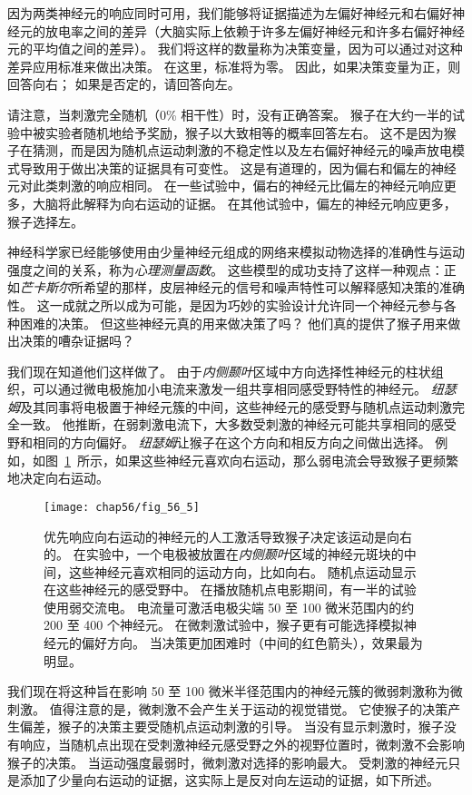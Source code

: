 因为两类神经元的响应同时可用，我们能够将证据描述为左偏好神经元和右偏好神经元的放电率之间的差异（大脑实际上依赖于许多左偏好神经元和许多右偏好神经元的平均值之间的差异）。
我们将这样的数量称为决策变量，因为可以通过对这种差异应用标准来做出决策。
在这里，标准将为零。
因此，如果决策变量为正，则回答向右；
如果是否定的，请回答向左。


请注意，当刺激完全随机（0\% 相干性）时，没有正确答案。
猴子在大约一半的试验中被实验者随机地给予奖励，猴子以大致相等的概率回答左右。
这不是因为猴子在猜测，而是因为随机点运动刺激的不稳定性以及左右偏好神经元的噪声放电模式导致用于做出决策的证据具有可变性。
这是有道理的，因为偏右和偏左的神经元对此类刺激的响应相同。
在一些试验中，偏右的神经元比偏左的神经元响应更多，大脑将此解释为向右运动的证据。
在其他试验中，偏左的神经元响应更多，猴子选择左。


神经科学家已经能够使用由少量神经元组成的网络来模拟动物选择的准确性与运动强度之间的关系，称为\textit{心理测量函数}。
这些模型的成功支持了这样一种观点：正如\textit{芒卡斯尔}所希望的那样，皮层神经元的信号和噪声特性可以解释感知决策的准确性。
这一成就之所以成为可能，是因为巧妙的实验设计允许同一个神经元参与各种困难的决策。
但这些神经元真的用来做决策了吗？
他们真的提供了猴子用来做出决策的嘈杂证据吗？


我们现在知道他们这样做了。
由于\textit{内侧颞叶}区域中方向选择性神经元的柱状组织，可以通过微电极施加小电流来激发一组共享相同感受野特性的神经元。
\textit{纽瑟姆}及其同事将电极置于神经元簇的中间，这些神经元的感受野与随机点运动刺激完全一致。
他推断，在弱刺激电流下，大多数受刺激的神经元可能共享相同的感受野和相同的方向偏好。
\textit{纽瑟姆}让猴子在这个方向和相反方向之间做出选择。
例如，如图~\ref{fig:56_5}~所示，如果这些神经元喜欢向右运动，那么弱电流会导致猴子更频繁地决定向右运动。


\begin{figure}[htbp]
	\centering
	\texttt{[image: chap56/fig\_56\_5]}
	\caption{优先响应向右运动的神经元的人工激活导致猴子决定该运动是向右的。
		在实验中，一个电极被放置在\textit{内侧颞叶}区域的神经元斑块的中间，这些神经元喜欢相同的运动方向，比如向右。
		随机点运动显示在这些神经元的感受野中。
		在播放随机点电影期间，有一半的试验使用弱交流电。
		电流量可激活电极尖端 50 至 100 微米范围内的约 200 至 400 个神经元。
		在微刺激试验中，猴子更有可能选择模拟神经元的偏好方向。
		当决策更加困难时（中间的红色箭头），效果最为明显\cite{ditterich2003microstimulation}。}
	\label{fig:56_5}
\end{figure}


我们现在将这种旨在影响 50 至 100 微米半径范围内的神经元簇的微弱刺激称为微刺激。
值得注意的是，微刺激不会产生关于运动的视觉错觉。
它使猴子的决策产生偏差，猴子的决策主要受随机点运动刺激的引导。
当没有显示刺激时，猴子没有响应，当随机点出现在受刺激神经元感受野之外的视野位置时，微刺激不会影响猴子的决策。
当运动强度最弱时，微刺激对选择的影响最大。
受刺激的神经元只是添加了少量向右运动的证据，这实际上是反对向左运动的证据，如下所述。


